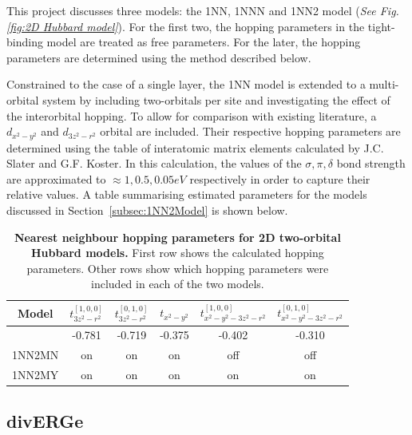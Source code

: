 \documentclass[12pt]{article}
\begin{document}
This project discusses three models: the 1NN, 1NNN and 1NN2 model (\textit{See Fig.\ref{fig:2D Hubbard model}}). For the first two, the hopping parameters in the tight-binding model are treated as free parameters. 
For the later, the hopping parameters are determined using the method described below. \par
\medskip
\noindent Constrained to the case of a single layer, the 1NN model is extended to a multi-orbital system by
including two-orbitals per site and investigating the effect of the interorbital hopping. To allow for comparison with
existing literature\cite{sakakibara2024possible}, a $d_{x^2-y^2}$ and $d_{3z^2 -r^2}$ orbital are included. 
Their respective hopping parameters are determined using the  table of interatomic matrix elements calculated by J.C. Slater and G.F. Koster\cite{slater1954simplified}. 
In this calculation, the values of the $\sigma,  \pi, \delta$ bond strength  are approximated to  $\approx  1, 0.5, 0.05eV$ respectively in order to capture their relative values\cite{blanksby2003bond, mcgrady2015introduction, krapp2008strength}.
A table summarising estimated parameters for the models  discussed in Section~\ref{subsec:1NN2Model} is shown below.

\begin{table}[h]
    \centering
    \begin{tabular}{|c|c|c|c|c|c|}
        \hline
       Model &$t^{[1,0,0]}_{3z^2-r^2}$  &$t^{[0,1,0]}_{3z^2-r^2}$  &  $t_{x^2 - y^2}$ &  $t^{[1,0,0]}_{x^2 - y^2 -3z^2-r^2} $ & $t^{[0,1,0]}_{x^2 - y^2 -3z^2-r^2} $ \\
        \hline
        & -0.781 & -0.719  &  -0.375 & -0.402 & -0.310\\
        \hline
        1NN2MN & on &  on  & on  & off & off  \\
        \hline
        1NN2MY & on &  on  & on  & on & on \\
          
        \hline
    \end{tabular}
    \caption{\textbf{Nearest neighbour hopping parameters for 2D  two-orbital Hubbard models.} First row shows the calculated hopping parameters. Other rows show which hopping parameters were included in each of the two models.}
    \label{tab:2D2orbparams }
\end{table}

\subsection{divERGe}
\label{subsec:diverge}
\end{document}

